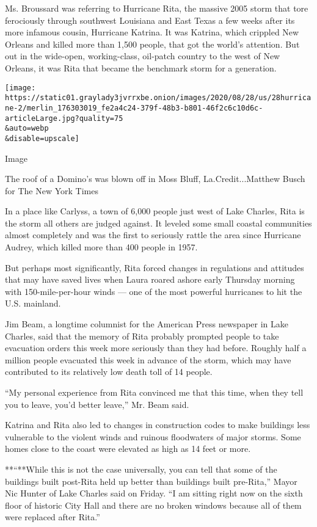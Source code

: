 Ms. Broussard was referring to Hurricane Rita, the massive 2005 storm
that tore ferociously through southwest Louisiana and East Texas a few
weeks after its more infamous cousin, Hurricane Katrina. It was Katrina,
which crippled New Orleans and killed more than 1,500 people, that got
the world's attention. But out in the wide-open, working-class,
oil-patch country to the west of New Orleans, it was Rita that became
the benchmark storm for a generation.

\texttt{[image: https://static01.graylady3jvrrxbe.onion/images/2020/08/28/us/28hurricane-2/merlin\_176303019\_fe2a4c24-379f-48b3-b801-46f2c6c10d6c-articleLarge.jpg?quality=75\\\&auto=webp\\\&disable=upscale]}

Image

The roof of a Domino's was blown off in Moss Bluff, La.Credit...Matthew
Busch for The New York Times

In a place like Carlyss, a town of 6,000 people just west of Lake
Charles, Rita is the storm all others are judged against. It leveled
some small coastal communities almost completely and was the first to
seriously rattle the area since Hurricane Audrey, which killed more than
400 people in 1957.

But perhaps most significantly, Rita forced changes in regulations and
attitudes that may have saved lives when Laura roared ashore early
Thursday morning with 150-mile-per-hour winds --- one of the most
powerful hurricanes to hit the U.S. mainland.

Jim Beam, a longtime columnist for the American Press newspaper in Lake
Charles, said that the memory of Rita probably prompted people to take
evacuation orders this week more seriously than they had before. Roughly
half a million people evacuated this week in advance of the storm, which
may have contributed to its relatively low death toll of 14 people.

``My personal experience from Rita convinced me that this time, when
they tell you to leave, you'd better leave,'' Mr. Beam said.

Katrina and Rita also led to changes in construction codes to make
buildings less vulnerable to the violent winds and ruinous floodwaters
of major storms. Some homes close to the coast were elevated as high as
14 feet or more.

**``**While this is not the case universally, you can tell that some of
the buildings built post-Rita held up better than buildings built
pre-Rita,'' Mayor Nic Hunter of Lake Charles said on Friday. ``I am
sitting right now on the sixth floor of historic City Hall and there are
no broken windows because all of them were replaced after Rita.''

